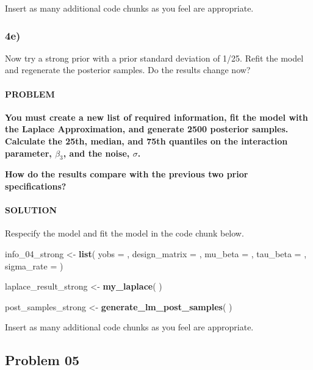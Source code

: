 \documentclass[
]{article}
\newenvironment{Shaded}{\begin{snugshade}}{\end{snugshade}}
\newcommand{\DataTypeTok}[1]{\textcolor[rgb]{0.13,0.29,0.53}{#1}}
\newcommand{\DecValTok}[1]{\textcolor[rgb]{0.00,0.00,0.81}{#1}}
\newcommand{\KeywordTok}[1]{\textcolor[rgb]{0.13,0.29,0.53}{\textbf{#1}}}
\newcommand{\NormalTok}[1]{#1}
\newcommand{\StringTok}[1]{\textcolor[rgb]{0.31,0.60,0.02}{#1}}
\begin{document}
Insert as many additional code chunks as you feel are appropriate.

\hypertarget{e-3}{%
\subsubsection{4e)}\label{e-3}}

Now try a strong prior with a prior standard deviation of 1/25. Refit
the model and regenerate the posterior samples. Do the results change
now?

\hypertarget{problem-22}{%
\paragraph{PROBLEM}\label{problem-22}}

\textbf{You must create a new list of required information, fit the
model with the Laplace Approximation, and generate 2500 posterior
samples. Calculate the 25th, median, and 75th quantiles on the
interaction parameter, \(\beta_3\), and the noise, \(\sigma\).}

\textbf{How do the results compare with the previous two prior
specifications?}

\hypertarget{solution-21}{%
\paragraph{SOLUTION}\label{solution-21}}

Respecify the model and fit the model in the code chunk below.

\begin{Shaded}
\begin{Highlighting}[]
\NormalTok{info_}\DecValTok{04}\NormalTok{_strong <-}\StringTok{ }\KeywordTok{list}\NormalTok{(}
  \DataTypeTok{yobs =}\NormalTok{ ,}
  \DataTypeTok{design_matrix =}\NormalTok{ ,}
  \DataTypeTok{mu_beta =}\NormalTok{ ,}
  \DataTypeTok{tau_beta =}\NormalTok{ ,}
  \DataTypeTok{sigma_rate =} 
\NormalTok{)}

\NormalTok{laplace_result_strong <-}\StringTok{ }\KeywordTok{my_laplace}\NormalTok{( )}

\NormalTok{post_samples_strong <-}\StringTok{ }\KeywordTok{generate_lm_post_samples}\NormalTok{( )}
\end{Highlighting}
\end{Shaded}

Insert as many additional code chunks as you feel are appropriate.

\hypertarget{problem-05}{%
\subsection{Problem 05}\label{problem-05}}
\end{document}
